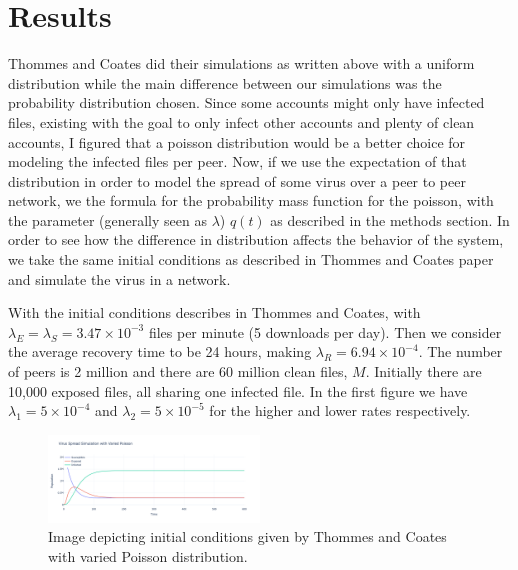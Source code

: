 \documentclass[12pt, oneside]{article}
\begin{document}
    \section{Results}
        Thommes and Coates did their simulations as written above with a uniform distribution while the main difference between our simulations was the probability distribution chosen.
        Since some accounts might only have infected files, existing with the goal to only infect other accounts and plenty of clean accounts, I figured that a poisson distribution
        would be a better choice for modeling the infected files per peer. Now, if we use the expectation of that distribution in order to model the spread of some 
        virus over a peer to peer network, we the formula for the probability mass function for the poisson, with the parameter (generally seen as $\lambda$) $q(t)$ as described in the 
        methods section. In order to see how the difference in distribution affects the behavior of the system, we take the same initial conditions as described in Thommes and Coates paper
        and simulate the virus in a network.\newline

        With the initial conditions describes in Thommes and Coates, with $\lambda_E = \lambda_S=3.47\times 10^{-3}$ files per minute (5 downloads per day). Then we consider the average recovery
        time to be 24 hours, making $\lambda_R=6.94\times 10^{-4}$. The number of peers is 2 million and there are 60 million clean files, $M$. Initially there are 10,000 exposed files, all sharing one
        infected file. In the first figure we have $\lambda_1=5\times 10^{-4}$ and $\lambda_2=5\times 10^{-5}$ for the higher and lower rates respectively.
        \begin{figure}[htbp]
            \centering
            \includegraphics[width=0.5\textwidth]{2MPoisson.png}
            \caption{Image depicting initial conditions given by Thommes and Coates with varied Poisson distribution.}
        \end{figure}
\end{document}
